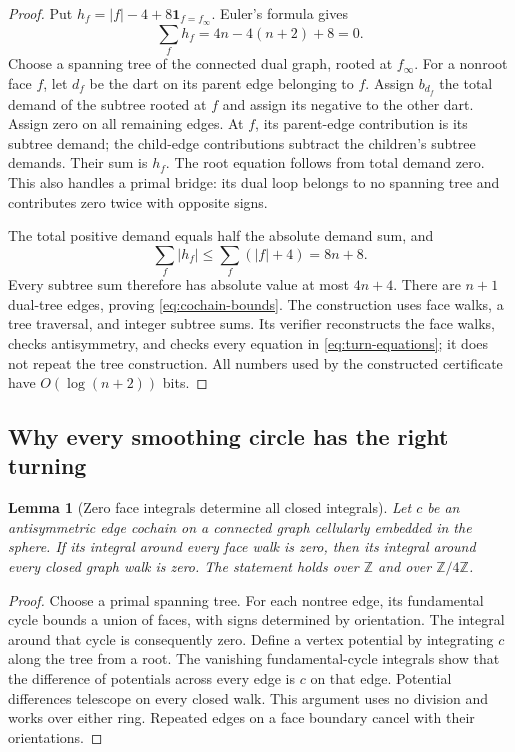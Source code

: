 \documentclass[11pt]{article}
\newtheorem{lemma}[theorem]{Lemma}
\theoremstyle{definition}
\theoremstyle{remark}
\newcommand{\Z}{\mathbb Z}
\begin{document}
\begin{proof}
Put $h_f=|f|-4+8\mathbf1_{f=f_\infty}$. Euler's formula gives
\[
 \sum_f h_f=4n-4(n+2)+8=0.
\]
Choose a spanning tree of the connected dual graph, rooted at $f_\infty$.
For a nonroot face $f$, let $d_f$ be the dart on its parent edge belonging
to $f$. Assign $b_{d_f}$ the total demand of the subtree rooted at $f$ and
assign its negative to the other dart. Assign zero on all remaining edges.
At $f$, its parent-edge contribution is its subtree demand; the
child-edge contributions subtract the children's subtree demands.
Their sum is $h_f$. The root equation follows from total demand zero.
This also handles a primal bridge: its dual loop belongs to no spanning
tree and contributes zero twice with opposite signs.

The total positive demand equals half the absolute demand sum, and
\[
 \sum_f |h_f|\le\sum_f(|f|+4)=8n+8.
\]
Every subtree sum therefore has absolute value at most $4n+4$.
There are $n+1$ dual-tree edges, proving \eqref{eq:cochain-bounds}.
The construction uses face walks, a tree traversal, and integer subtree
sums. Its verifier reconstructs the face walks, checks antisymmetry, and
checks every equation in \eqref{eq:turn-equations}; it does not repeat the
tree construction. All numbers used by the constructed certificate have
$O(\log(n+2))$ bits.
\end{proof}

\subsection{Why every smoothing circle has the right turning}

\begin{lemma}[Zero face integrals determine all closed integrals]
\label{lem:closed-cochain}
Let $c$ be an antisymmetric edge cochain on a connected graph cellularly
embedded in the sphere. If its integral around every face walk is zero,
then its integral around every closed graph walk is zero. The statement
holds over $\Z$ and over $\Z/4\Z$.
\end{lemma}

\begin{proof}
Choose a primal spanning tree. For each nontree edge, its fundamental
cycle bounds a union of faces, with signs determined by orientation.
The integral around that cycle is consequently zero. Define a vertex
potential by integrating $c$ along the tree from a root. The vanishing
fundamental-cycle integrals show that the difference of potentials across
every edge is $c$ on that edge. Potential differences telescope on every
closed walk. This argument uses no division and works over either ring.
Repeated edges on a face boundary cancel with their orientations.
\end{proof}
\end{document}
